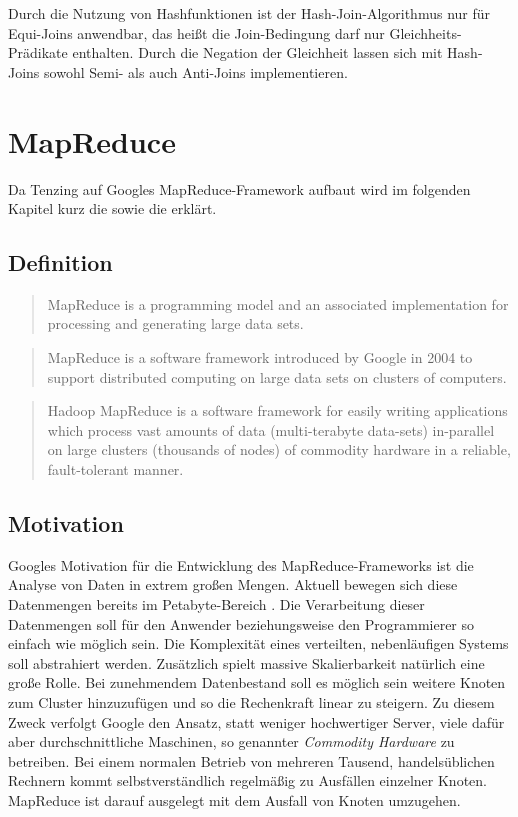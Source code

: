 \documentclass[a4paper]{article}
\begin{document}
Durch die Nutzung von Hashfunktionen ist der Hash-Join-Algorithmus nur für Equi-Joins anwendbar, das heißt die Join-Bedingung darf nur Gleichheits-Prädikate enthalten. Durch die Negation der Gleichheit lassen sich mit Hash-Joins sowohl Semi- als auch Anti-Joins implementieren.

\newpage

\section{MapReduce}
\label{mapreduce}
Da Tenzing auf Googles MapReduce-Framework aufbaut wird im folgenden Kapitel kurz die  sowie die  erklärt.

\subsection{Definition}
\begin{quote}
MapReduce is a programming model and an associated implementation for processing and generating large data sets. \cite{MAPREDUCE}
\end{quote}

\begin{quote}
MapReduce is a software framework introduced by Google in 2004 to support distributed computing on large data sets on clusters of computers. \cite{WP-MAPREDUCE}
\end{quote}

\begin{quote}
Hadoop MapReduce is a software framework for easily writing applications which process vast amounts of data (multi-terabyte data-sets) in-parallel on large clusters (thousands of nodes) of commodity hardware in a reliable, fault-tolerant manner. \cite{HADOOP}
\end{quote}

\subsection{Motivation}
\label{sec:mapreduce-motivation}
Googles Motivation für die Entwicklung des MapReduce-Frameworks ist die Analyse von Daten in extrem großen Mengen. Aktuell bewegen sich diese Datenmengen bereits im Petabyte-Bereich \cite{TENZING}. Die Verarbeitung dieser Datenmengen soll für den Anwender beziehungsweise den Programmierer so einfach wie möglich sein. Die Komplexität eines verteilten, nebenläufigen Systems soll abstrahiert werden. Zusätzlich spielt massive Skalierbarkeit natürlich eine große Rolle. Bei zunehmendem Datenbestand soll es möglich sein weitere Knoten zum Cluster hinzuzufügen und so die Rechenkraft linear zu steigern. Zu diesem Zweck verfolgt Google den Ansatz, statt weniger hochwertiger Server, viele dafür aber durchschnittliche Maschinen, so genannter \textit{Commodity Hardware} zu betreiben. Bei einem normalen Betrieb von mehreren Tausend, handelsüblichen Rechnern kommt selbstverständlich regelmäßig zu Ausfällen einzelner Knoten. MapReduce ist darauf ausgelegt mit dem Ausfall von Knoten umzugehen. 
\end{document}
